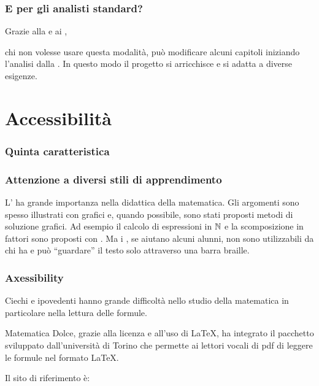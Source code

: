 \documentclass{beamer} %
\begin{document}
\begin{frame}\frametitle{E per gli analisti standard?}

Grazie alla  e ai ,

\pause
chi non volesse usare questa modalità, può modificare 
alcuni capitoli iniziando l'analisi dalla 
.
\spause
In questo modo il progetto si arricchisce e si adatta a diverse esigenze.
\end{frame}


\section{Accessibilità}


\begin{frame}\frametitle{Quinta caratteristica}

\begin{center}  \end{center}

\end{frame}



\begin{frame}\frametitle{Attenzione a diversi stili di apprendimento}

L' ha grande importanza nella didattica della 
matematica.
\spause
Gli argomenti sono spesso illustrati con grafici e, quando possibile, sono 
stati proposti metodi di soluzione grafici.
\spause
Ad esempio il calcolo di espressioni in \(\mathbb{N}\) e la scomposizione in 
fattori sono proposti con .
\spause
Ma i , se aiutano alcuni alunni, non sono 
utilizzabili da chi ha  e può ``guardare'' 
il testo solo attraverso una barra braille.

\end{frame}


\begin{frame}\frametitle{Axessibility}

Ciechi e ipovedenti hanno grande difficoltà nello studio della matematica 
in particolare nella lettura delle formule.

Matematica Dolce, grazie alla licenza e all'uso di \LaTeX, ha integrato il 
pacchetto  sviluppato dall'università di Torino 
che permette ai lettori vocali di pdf di leggere le formule nel formato 
\LaTeX.

\bigskip
Il sito di riferimento è:

\begin{center}
\end{center}

\end{frame}
\end{document}
